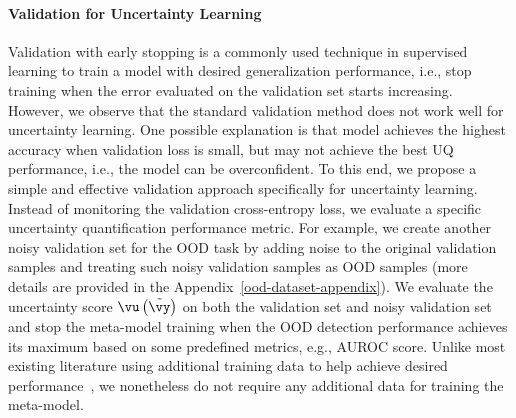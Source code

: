 \paragraph{Validation for Uncertainty Learning} \label{sec:validation}


Validation with early stopping is a commonly used technique in supervised learning to train a model with desired generalization performance, i.e., stop training when the error evaluated on the validation set starts increasing. However, we observe that the standard validation method does not work well for uncertainty learning. One possible explanation is that model achieves the highest accuracy when validation loss is small, but may not achieve the best UQ performance, i.e., the model can be overconfident. To this end, we propose a simple and effective validation approach specifically for uncertainty learning. Instead of monitoring the validation cross-entropy loss, we evaluate a specific uncertainty quantification performance metric. For example, we create another noisy validation set for the OOD task by adding noise to the original validation samples and treating such noisy validation samples as OOD samples (more details are provided in the Appendix~\ref{ood-dataset-appendix}). We evaluate the uncertainty score $\vu\left(\tilde{\vy}\right)$ on both the validation set and noisy validation set and stop the meta-model training when the OOD detection performance achieves its maximum based on some predefined metrics, e.g., AUROC score. Unlike most existing literature using additional training data to help achieve desired performance~\citep{hendrycks2018deep, kristiadi2021learnable, malinin2018predictive}, we nonetheless do not require any additional data for training the meta-model.



